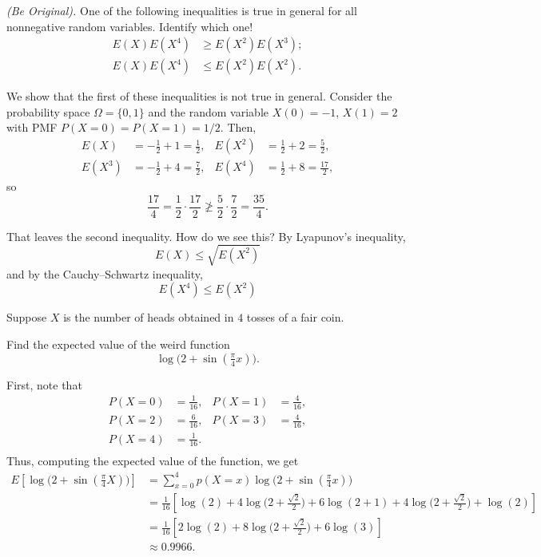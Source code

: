 \begin{problem}[Handout 7, \# 14]
  \emph{(Be Original).} One of the following inequalities is true in
  general for all nonnegative random variables. Identify which one!
  \begin{align*}
    E(X)E(X^4)&\geq E(X^2)E(X^3);\\
    E(X)E(X^4)&\leq E(X^2)E(X^2).
  \end{align*}
\end{problem}
\begin{solution}
  We show that the first of these inequalities is not true in
  general. Consider the probability space \(\Omega=\{0,1\}\) and the random
  variable \(X(0)=-1\), \(X(1)=2\) with PMF \(P(X=0)=P(X=1)=1/2\). Then,
  \begin{align*}
    E(X)&=-\frac{1}{2}+1=\frac{1}{2},&
    E(X^2)&=\frac{1}{2}+2=\frac{5}{2},\\
    E(X^3)&=-\frac{1}{2}+4=\frac{7}{2},&
    E(X^4)&=\frac{1}{2}+8=\frac{17}{2},
  \end{align*}
  so
  \[
    \frac{17}{4}=\frac{1}{2}\cdot\frac{17}{2}\ngeq
    \frac{5}{2}\cdot\frac{7}{2}=\frac{35}{4}.
  \]

  That leaves the second inequality. How do we see this? By Lyapunov's
  inequality,
  \[
    E(X)\leq \sqrt{E(X^2)}
  \]
  and by the Cauchy--Schwartz inequality,
  \[
    E(X^4)\leq E(X^2)
  \]
\end{solution}
\newpage

\begin{problem}[Handout 7, \# 15]
  Suppose \(X\) is the number of heads obtained in \(4\) tosses of a fair
  coin.

  Find the expected value of the weird function
  \[
    \log\bigl( 2+\sin(\tfrac{\pi}{4}x) \bigr).
  \]
\end{problem}
\begin{solution}
  First, note that
  \begin{align*}
    P(X=0) &= \frac{1}{16},&
    P(X=1) &= \frac{4}{16},\\
    P(X=2) &= \frac{6}{16},&
    P(X=3) &= \frac{4}{16},\\
    P(X=4) &= \frac{1}{16}.\\
  \end{align*}
  Thus, computing the expected value of the function, we get
  \begin{align*}
    E\left[\log\bigl( 2+\sin(\tfrac{\pi}{4}X) \bigr)\right]
    &= \sum_{x=0}^4 p(X=x)\log\bigl( 2+\sin(\tfrac{\pi}{4}x) \bigr)\\
    &= \frac{1}{16} \left[\log(2) +4 \log \bigl(2+\tfrac{\sqrt{2}}{2}
      \bigr) +6 \log (2+1) +4 \log \bigl(2+\tfrac{\sqrt{2}}{2}
      \bigr) + \log(2)\right]\\
    &=\frac{1}{16} \left[2\log(2) +8 \log \bigl(2+\tfrac{\sqrt{2}}{2}
      \bigr) +6 \log (3) \right]\\
    &\approx 0.9966.
  \end{align*}
\end{solution}
\newpage

